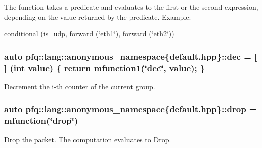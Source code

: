 The function takes a predicate and evaluates to the first or the second expression, depending on the value returned by the predicate. Example\+:

conditional (is\+\_\+udp, forward (\char`\"{}eth1\char`\"{}), forward (\char`\"{}eth2\char`\"{})) \hypertarget{namespacepfq_1_1lang_1_1anonymous__namespace_02default_8hpp_03_a139906841e77a2eb86b761b27ceeb685}{
\subsubsection[{dec}]{\setlength{\rightskip}{0pt plus 5cm}auto pfq\+::lang\+::anonymous\+\_\+namespace\{default.\+hpp\}\+::dec = \mbox{[}$\,$\mbox{]} (int value) \{ return {\bf mfunction1}(\char`\"{}dec\char`\"{}, value); \}}}\label{namespacepfq_1_1lang_1_1anonymous__namespace_02default_8hpp_03_a139906841e77a2eb86b761b27ceeb685}


Decrement the i-\/th counter of the current group. 

\hypertarget{namespacepfq_1_1lang_1_1anonymous__namespace_02default_8hpp_03_a0d715988e000ac6284a1615091eb4067}{
\subsubsection[{drop}]{\setlength{\rightskip}{0pt plus 5cm}auto pfq\+::lang\+::anonymous\+\_\+namespace\{default.\+hpp\}\+::drop = {\bf mfunction}(\char`\"{}drop\char`\"{})}}\label{namespacepfq_1_1lang_1_1anonymous__namespace_02default_8hpp_03_a0d715988e000ac6284a1615091eb4067}


Drop the packet. The computation evaluates to {\ttfamily Drop}. 

